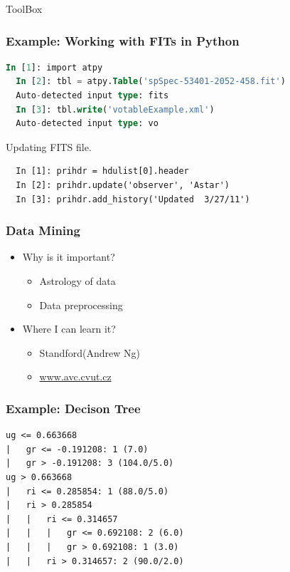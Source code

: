 \documentclass[fleqn]{beamer}
\begin{document}
\begin{section}{ToolBox}
\begin{frame}[containsverbatim]\frametitle{Example: Working with FITs
    in Python}
\begin{lstlisting}[language=SQL]
  In [1]: import atpy
  In [2]: tbl = atpy.Table('spSpec-53401-2052-458.fit')
  Auto-detected input type: fits
  In [3]: tbl.write('votableExample.xml')
  Auto-detected input type: vo
\end{lstlisting}
Updating FITS file.

\begin{lstlisting}
  In [1]: prihdr = hdulist[0].header
  In [2]: prihdr.update('observer', 'Astar')
  In [3]: prihdr.add_history('Updated  3/27/11')
\end{lstlisting}

\end{frame}



  \begin{frame}\frametitle{Data Mining}
  \begin{itemize}
    \item{Why is it important?}
      \begin{itemize}
      \item Astrology of data
      \item Data preprocessing
      \end{itemize}
    \item{Where I can learn it?}
      \begin{itemize}
      \item {Standford(Andrew Ng)}
      \item {\url{www.avc.cvut.cz}}
      \end{itemize}
  \end{itemize}
  \end{frame}

\begin{frame}[containsverbatim]\frametitle{Example: Decison Tree}

\begin{lstlisting}
ug <= 0.663668
|   gr <= -0.191208: 1 (7.0)
|   gr > -0.191208: 3 (104.0/5.0)
ug > 0.663668
|   ri <= 0.285854: 1 (88.0/5.0)
|   ri > 0.285854
|   |   ri <= 0.314657
|   |   |   gr <= 0.692108: 2 (6.0)
|   |   |   gr > 0.692108: 1 (3.0)
|   |   ri > 0.314657: 2 (90.0/2.0)
\end{lstlisting}

\end{frame}


\end{section}
\end{document}
